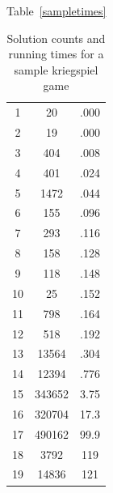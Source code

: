 \documentclass[11pt]{article}
\begin{document}
Table~\ref{sampletimes}
\begin{table}
\begin{tabular}{ccc}
1 & 20 & .000\\
2 & 19 & .000\\
3 & 404 & .008\\
4 & 401 & .024\\
5 & 1472 & .044\\
6 & 155 & .096\\
7 & 293 & .116\\
8 & 158 & .128\\
9 & 118 & .148\\
10 & 25 & .152\\
11 & 798 & .164\\
12 & 518 & .192\\
13 & 13564 & .304\\
14 & 12394 & .776\\
15 & 343652 & 3.75\\
16 & 320704 & 17.3\\
17 & 490162 & 99.9\\
18 & 3792 & 119\\
19 & 14836 & 121 \\
\end{tabular}
\caption{Solution counts and running times for a sample kriegspiel game}
\label{blacktimes}
\end{table}




\nocite{richards09information}
\nocite{russell05efficient}
\nocite{kuhn03lectures}
\nocite{kuhn97classics}
\nocite{parker05sampling}
\nocite{nance06reasoning}
\nocite{li94chess}



\end{document}

